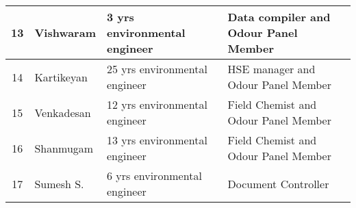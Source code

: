 \begin{landscape}
\begin{table}[p]
\begin{tabular}{|c|l|l|l|}
13 & Vishwaram & 3 yrs environmental engineer & Data compiler and Odour Panel Member \\ \hline
14 & Kartikeyan & 25 yrs environmental engineer & HSE manager and Odour Panel Member \\ \hline
15 & Venkadesan & 12 yrs environmental engineer & Field Chemist and Odour Panel Member \\ \hline
16 & Shanmugam & 13 yrs environmental engineer & Field Chemist and Odour Panel Member \\ \hline
17 & Sumesh S. & 6 yrs environmental engineer & Document Controller \\ \hline
\end{tabular}
\end{table}
\end{landscape}
